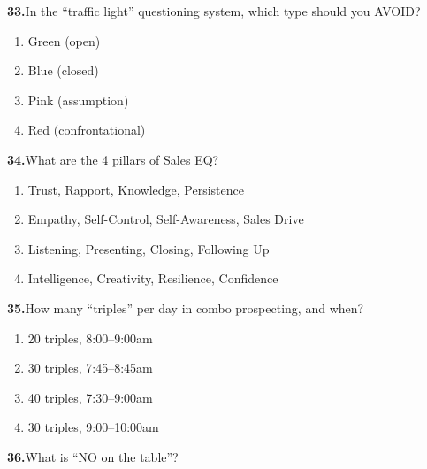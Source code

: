 \documentclass[11pt,letterpaper]{article}
\newif\ifshowsolutions
\newcommand{\answer}[1]{%
  \ifshowsolutions
    \begin{tcolorbox}[colback=green!5!white, colframe=answergreen, title={\small\textbf{Answer}}, fonttitle=\color{white}, coltitle=white, colbacktitle=answergreen, boxrule=0.5pt, arc=2pt, left=4pt, right=4pt, top=2pt, bottom=2pt]
    {\small #1}
    \end{tcolorbox}
  \fi
}
\begin{document}
\vspace{0.5em}

\noindent\textbf{33.}\quad In the ``traffic light'' questioning system, which type should you AVOID?

\begin{enumerate}[label=\Alph*), leftmargin=2em, itemsep=0pt]
\item Green (open)
\item Blue (closed)
\item Pink (assumption)
\item Red (confrontational)
\end{enumerate}
\answer{C) Pink (assumption). Pink questions impose your view: ``So you must be unhappy with your bank?'' Start Green, confirm with Blue.}

\vspace{0.5em}

\noindent\textbf{34.}\quad What are the 4 pillars of Sales EQ?

\begin{enumerate}[label=\Alph*), leftmargin=2em, itemsep=0pt]
\item Trust, Rapport, Knowledge, Persistence
\item Empathy, Self-Control, Self-Awareness, Sales Drive
\item Listening, Presenting, Closing, Following Up
\item Intelligence, Creativity, Resilience, Confidence
\end{enumerate}
\answer{B) Empathy, Self-Control, Self-Awareness, and Sales Drive.}

\vspace{0.5em}

\noindent\textbf{35.}\quad How many ``triples'' per day in combo prospecting, and when?

\begin{enumerate}[label=\Alph*), leftmargin=2em, itemsep=0pt]
\item 20 triples, 8:00--9:00am
\item 30 triples, 7:45--8:45am
\item 40 triples, 7:30--9:00am
\item 30 triples, 9:00--10:00am
\end{enumerate}
\answer{B) 30 triples/day, 7:45--8:45am. Each takes 2 minutes or less. 8--12 touches to convert.}

\vspace{0.5em}

\noindent\textbf{36.}\quad What is ``NO on the table''?
\end{document}
